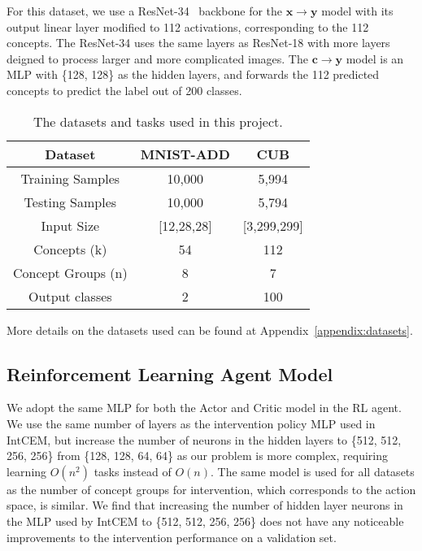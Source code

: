 For this dataset, we use a ResNet-34~\cite{resnet} backbone for the $\mathbf{x} \to \mathbf{y}$
model with its output linear layer modified to 112 activations, corresponding
to the 112 concepts. The ResNet-34 uses the same layers as ResNet-18
with more layers deigned to process larger and more complicated images.
The $\mathbf{c} \to \mathbf{y}$ model is an MLP with \{128, 128\} as the hidden
layers, and forwards the 112 predicted concepts to predict the label out of 200 classes.


\begin{table}
    \centering
    \renewcommand{\arraystretch}{1.5}
    \begin{tabular}{c|cc}

    Dataset & MNIST-ADD & CUB \\
    \hline
    Training Samples & 10,000 & 5,994 \\
    Testing Samples & 10,000 & 5,794 \\
    Input Size & [12,28,28] & [3,299,299]\\
    Concepts (k) & 54 & 112 \\
    Concept Groups (n) & 8 & 7 \\
    Output classes & 2 & 100
    \end{tabular}
    \caption{The datasets and tasks used in this project.}
    \label{table:datasets}
\end{table}

More details on the datasets used can be found at Appendix~\ref{appendix:datasets}.

\subsection{Reinforcement Learning Agent Model}
We adopt the same MLP for 
both the Actor and Critic model in the RL agent. 
We use the same number of layers as the intervention policy
 MLP used in IntCEM, but increase the number of neurons in the hidden layers
 to \{512, 512, 256, 256\} from \{128, 128, 64, 64\} as
 our problem is more complex, requiring 
 learning $O(n^2)$ tasks instead of $O(n)$.
 The same model is used
 for all datasets as the number of concept groups for intervention,
 which corresponds to the action space,
 is similar. We find that increasing the number of hidden layer neurons
 in the MLP used by 
 IntCEM to \{512, 512, 256, 256\} does not have any noticeable improvements
 to the intervention performance
 on a validation set.
    
